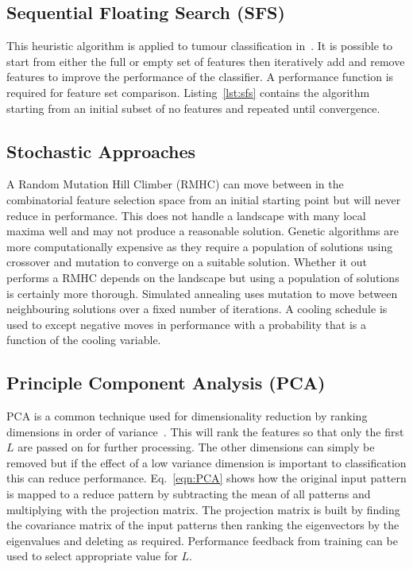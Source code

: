 \documentclass[journal]{IEEEtran}
\begin{document}
\subsection{Sequential Floating Search (SFS)}

This heuristic algorithm is applied to tumour classification in~\cite{hau07feat}.
It is possible to start from either the full or empty set of features then iteratively add and remove features to improve the performance of the classifier. 
A performance function is required for feature set comparison. 
Listing~\ref{lst:sfs} contains the algorithm starting from an initial subset of no features and repeated until convergence.





\subsection{Stochastic Approaches}
A Random Mutation Hill Climber (RMHC) can move between in the combinatorial feature selection space from an initial starting point but will never reduce in performance.  
This does not handle a landscape with many local maxima well and may not produce a reasonable solution.
Genetic algorithms are more computationally expensive as they require a population of solutions using crossover and mutation to converge on a suitable solution.   
Whether it out performs a RMHC depends on the landscape but using a population of solutions is certainly more thorough.    
Simulated annealing uses mutation to move between neighbouring solutions over a fixed number of iterations.
A cooling schedule is used to except negative moves in performance with a probability that is a function of the cooling variable. 


\subsection{Principle Component Analysis (PCA)}
PCA is a common technique used for dimensionality reduction by ranking dimensions in order of variance~\cite{pearson01pca}.
This will rank the features so that only the first $L$ are passed on for further processing. 
The other dimensions can simply be removed but if the effect of a low variance dimension is important to classification this can reduce performance.
Eq.~\eqref{eqn:PCA} shows how the original input pattern is mapped to a reduce pattern by subtracting the mean of all patterns and multiplying with the projection matrix.
The projection matrix is built by finding the covariance matrix of the input patterns then ranking the eigenvectors by the eigenvalues and deleting as required.
Performance feedback from training can be used to select appropriate value for $L$.
\end{document}
